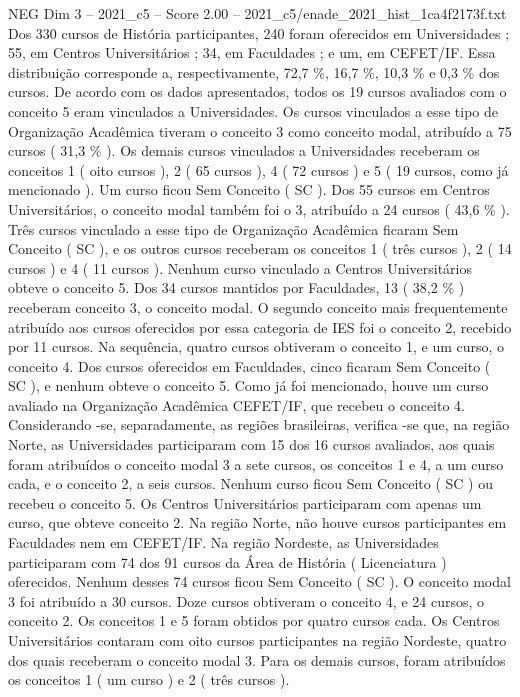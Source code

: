 \begin{textsample}{NEG Dim 3 – 2021\_c5 – Score 2.00 – 2021\_c5/enade\_2021\_hist\_1ca4f2173f.txt}
Dos 330 cursos de História participantes, 240 foram oferecidos em Universidades ; 55, em Centros Universitários ; 34, em Faculdades ; e um, em CEFET/IF.
Essa distribuição corresponde a, respectivamente, 72,7 \%, 16,7 \%, 10,3 \% e 0,3 \% dos cursos.
De acordo com os dados apresentados, todos os 19 cursos avaliados com o conceito 5 eram vinculados a Universidades.
Os cursos vinculados a esse tipo de Organização Acadêmica tiveram o conceito 3 como conceito modal, atribuído a 75 cursos ( 31,3 \% ).
Os demais cursos vinculados a Universidades receberam os conceitos 1 ( oito cursos ), 2 ( 65 cursos ), 4 ( 72 cursos ) e 5 ( 19 cursos, como já mencionado ).
Um curso ficou Sem Conceito ( SC ).
Dos 55 cursos em Centros Universitários, o conceito modal também foi o 3, atribuído a 24 cursos ( 43,6 \% ).
Três cursos vinculado a esse tipo de Organização Acadêmica ficaram Sem Conceito ( SC ), e os outros cursos receberam os conceitos 1 ( três cursos ), 2 ( 14 cursos ) e 4 ( 11 cursos ).
Nenhum curso vinculado a Centros Universitários obteve o conceito 5.
Dos 34 cursos mantidos por Faculdades, 13 ( 38,2 \% ) receberam conceito 3, o conceito modal.
O segundo conceito mais frequentemente atribuído aos cursos oferecidos por essa categoria de IES foi o conceito 2, recebido por 11 cursos.
Na sequência, quatro cursos obtiveram o conceito 1, e um curso, o conceito 4.
Dos cursos oferecidos em Faculdades, cinco ficaram Sem Conceito ( SC ), e nenhum obteve o conceito 5.
Como já foi mencionado, houve um curso avaliado na Organização Acadêmica CEFET/IF, que recebeu o conceito 4.
Considerando -se, separadamente, as regiões brasileiras, verifica -se que, na região Norte, as Universidades participaram com 15 dos 16 cursos avaliados, aos quais foram atribuídos o conceito modal 3 a sete cursos, os conceitos 1 e 4, a um curso cada, e o conceito 2, a seis cursos.
Nenhum curso ficou Sem Conceito ( SC ) ou recebeu o conceito 5.
Os Centros Universitários participaram com apenas um curso, que obteve conceito 2.
Na região Norte, não houve cursos participantes em Faculdades nem em CEFET/IF.
Na região Nordeste, as Universidades participaram com 74 dos 91 cursos da Área de História ( Licenciatura ) oferecidos.
Nenhum desses 74 cursos ficou Sem Conceito ( SC ).
O conceito modal 3 foi atribuído a 30 cursos.
Doze cursos obtiveram o conceito 4, e 24 cursos, o conceito 2.
Os conceitos 1 e 5 foram obtidos por quatro cursos cada.
Os Centros Universitários contaram com oito cursos participantes na região Nordeste, quatro dos quais receberam o conceito modal 3.
Para os demais cursos, foram atribuídos os conceitos 1 ( um curso ) e 2 ( três cursos ).

\end{textsample}
